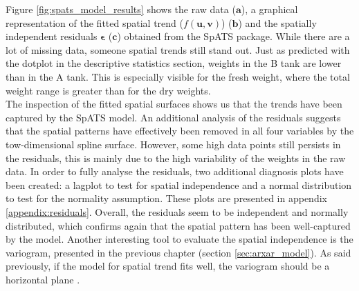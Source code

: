 Figure \ref{fig:spats_model_results} shows the raw data ($\mathbf{a}$), a graphical representation of the fitted spatial trend ($f(\boldsymbol{u}, \boldsymbol{v})$) ($\mathbf{b}$) and the spatially independent residuals $\boldsymbol{\epsilon}$ ($\mathbf{c}$) obtained from the SpATS package. While there are a lot of missing data, someone spatial trends still stand out. Just as predicted with the dotplot in the descriptive statistics section, weights in the B tank are lower than in the A tank. This is especially visible for the fresh weight, where the total weight range is greater than for the dry weights.\\

The inspection of the fitted spatial surfaces shows us that the trends have been captured by the SpATS model. An additional analysis of the residuals suggests that the spatial patterns have effectively been removed in all four variables by the tow-dimensional spline surface. However, some high data points still persists in the residuals, this is mainly due to the high variability of the weights in the raw data. In order to fully analyse the residuals, two additional diagnosis plots have been created: a lagplot to test for spatial independence and a normal distribution to test for the normality assumption. These plots are presented in appendix \ref{appendix:residuals}. Overall, the residuals seem to be independent and normally distributed, which confirms again that the spatial pattern has been well-captured by the model. Another interesting tool to evaluate the spatial independence is the variogram, presented in the previous chapter (section \ref{sec:arxar_model}). 
As said previously, if the model for spatial trend fits well, the variogram should be a horizontal plane \parencite{piepho_linear_2010}.\\

